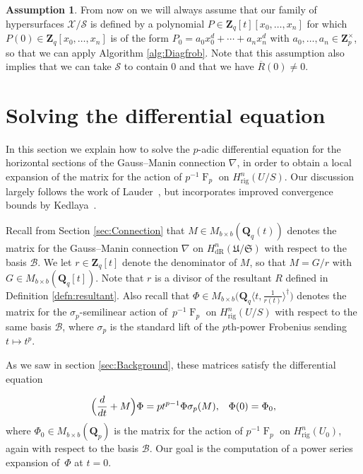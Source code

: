 \documentclass[a4paper,11pt]{article}
\numberwithin{equation}{section}
\newcommand{\ZZ}{\mathbf{Z}} %
\newcommand{\QQ}{\mathbf{Q}} %
\DeclareMathOperator{\Frob}{F}           %
\providecommand{\HdR}{H_{\text{dR}}}    %
\providecommand{\Hrig}{H_{\text{rig}}}  %
\providecommand{\cB}{\mathcal{B}} %
\theoremstyle{definition}
\newtheorem{assump}[thm]{Assumption}
\begin{document}
\begin{assump} \label{assump:diag}
From now on we will always assume that our family of hypersurfaces $\mathcal{X}/\mathcal{S}$ 
is defined by a polynomial $P \in \ZZ_q[t][x_0,\ldots,x_n]$ for which $P(0) \in \ZZ_q[x_0,\ldots,x_n]$ 
is of the form $P_0=a_0 x_0^d + \dotsb + a_n x_n^d$ with $a_0,\dotsc,a_n \in \ZZ_p^{\times}$, so that we
can apply Algorithm \ref{alg:Diagfrob}. Note that this assumption also implies that we can take $\mathcal{S}$
to contain $0$ and that we have $\overline{R}(0) \neq 0$.
\end{assump}


\section{Solving the differential equation}
\label{sec:DifferentialSystem}

In this section we explain how to solve the $p$-adic differential 
equation for the horizontal sections of the Gauss--Manin 
connection $\nabla$, in order to obtain a local expansion of the 
matrix for the action of $p^{-1} \Frob_p$ on $\Hrig^{n}(U/S)$.  
Our discussion largely follows the work of Lauder~\citep{Lauder2006}, 
but incorporates improved convergence bounds by Kedlaya~\citep{Kedlaya2010}.

Recall from Section \ref{sec:Connection} that $M \in M_{b \times b}(\QQ_q(t))$ denotes the matrix for 
the Gauss--Manin connection $\nabla$ on $\HdR^n(\mathfrak{U}/\mathfrak{S})$ with respect to the 
basis $\cB$. We let $r \in \ZZ_q[t]$ denote the denominator of $M$, so that $M = G/r$ with 
$G \in M_{b \times b}(\QQ_q[t])$. Note that $r$ is a divisor of the resultant $R$ defined in 
Definition \ref{defn:resultant}. Also recall that $\Phi \in M_{b \times b} \bigl(\QQ_q \langle t,\frac{1}{r(t)} \rangle^{\dag} \bigr)$ 
denotes the matrix for the $\sigma_p$-semilinear action of~$p^{-1} \Frob_p$ on $\Hrig^{n}(U/S)$ with 
respect to the same basis $\cB$, where $\sigma_p$ is the standard lift of the $p$th-power Frobenius 
sending $t \mapsto t^p$. 

As we saw in section \ref{sec:Background}, these matrices satisfy the differential equation

\begin{equation} \label{eq:Phi}
\Bigl(\frac{d}{dt} + M\Bigr) \Phi = p t^{p-1} \Phi \sigma_p(M), \; \; \; \Phi(0)=\Phi_0,
\end{equation}
where $\Phi_0 \in M_{b \times b}(\QQ_p)$ is the matrix for the action of $p^{-1} \Frob_p$ 
on $\Hrig^n(U_0)$, again with respect to the basis $\cB$. Our goal is 
the computation of a power series expansion of~$\Phi$ at $t=0$.
\end{document}
